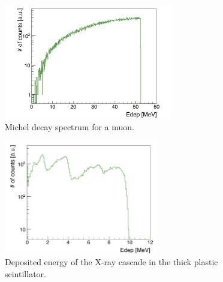 \documentclass[12pt]{article}
\begin{document}
\begin{figure}[ht!]
\centering
\includegraphics[width=0.66\textwidth]{img/michel}
\caption{Michel decay spectrum for a muon.}
\label{fig:michel}
\end{figure}
\begin{figure}[ht!]
\centering
\includegraphics[width=0.6\textwidth]{img/cascade}
\caption{Deposited energy of the X-ray cascade in the thick plastic scintillator.}
\label{fig:cascade}
\end{figure}
\end{document}

